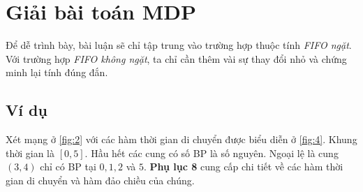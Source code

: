 \documentclass[../main.tex]{subfiles}
\begin{document}
\chapter{Giải bài toán MDP}\label{giux1ea3i-buxe0i-touxe1n-mdp}

Để dễ trình bày, bài luận sẽ chỉ tập trung vào trường hợp thuộc tính
\emph{FIFO ngặt}. Với trường hợp \emph{FIFO không ngặt}, ta chỉ cần thêm vài sự
thay đổi nhỏ và chứng minh lại tính đúng đắn.

\section{Ví dụ}\label{vuxed-dux1ee5}

Xét mạng ở \autoref{fig:2} với các hàm thời gian di chuyển được biểu diễn ở \autoref{fig:4}. 
Khung thời gian là \([0, 5]\). Hầu hết các cung có số BP là số
nguyên. Ngoại lệ là cung \((3, 4)\) chỉ có BP tại \(0, 1, 2\) và
\(5\). \textbf{Phụ lục 8} cung cấp chi tiết về các hàm thời gian di
chuyển và hàm đảo chiều của chúng.
\end{document}
